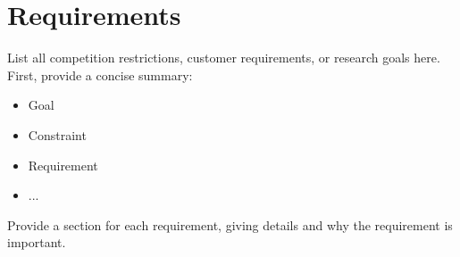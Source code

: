 
\chapter{Requirements}
\label{chap:requirements}

List all competition restrictions, customer requirements, or research goals here. First, provide a concise summary:

\begin{itemize}
  \item{Goal}
  \item{Constraint}
  \item{Requirement}
  \item{...}
\end{itemize}

Provide a section for each requirement, giving details and why the requirement is important.